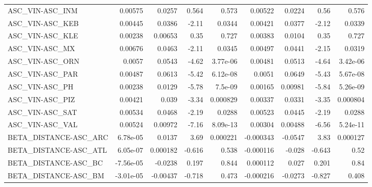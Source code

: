 \begin{tabular}{lrrrrrrrr}
ASC\_VIN-ASC\_INM                         &     0.00575 &       0.0257 &   0.564 &    0.573 &    0.00522 &      0.0224 &         0.56 &         0.576 \\
ASC\_VIN-ASC\_KEB                         &     0.00445 &       0.0386 &   -2.11 &   0.0344 &    0.00421 &      0.0377 &        -2.12 &        0.0339 \\
ASC\_VIN-ASC\_KLE                         &     0.00238 &      0.00653 &    0.35 &    0.727 &    0.00383 &      0.0104 &         0.35 &         0.727 \\
ASC\_VIN-ASC\_MX                          &     0.00676 &       0.0463 &   -2.11 &   0.0345 &    0.00497 &      0.0441 &        -2.15 &        0.0319 \\
ASC\_VIN-ASC\_ORN                         &      0.0057 &       0.0543 &   -4.62 & 3.77e-06 &    0.00481 &      0.0513 &        -4.64 &      3.42e-06 \\
ASC\_VIN-ASC\_PAR                         &     0.00487 &       0.0613 &   -5.42 & 6.12e-08 &     0.0051 &      0.0649 &        -5.43 &      5.67e-08 \\
ASC\_VIN-ASC\_PH                          &     0.00238 &       0.0129 &   -5.78 &  7.5e-09 &    0.00165 &     0.00981 &        -5.84 &      5.26e-09 \\
ASC\_VIN-ASC\_PIZ                         &     0.00421 &        0.039 &   -3.34 & 0.000829 &    0.00337 &      0.0331 &        -3.35 &      0.000804 \\
ASC\_VIN-ASC\_SAT                         &     0.00534 &       0.0468 &   -2.19 &   0.0288 &    0.00523 &      0.0445 &        -2.19 &        0.0288 \\
ASC\_VIN-ASC\_VAL                         &     0.00524 &      0.00972 &   -7.16 & 8.09e-13 &    0.00304 &     0.00488 &        -6.56 &      5.24e-11 \\
BETA\_DISTANCE-ASC\_ARC                   &    6.78e-05 &       0.0137 &    3.69 & 0.000221 &  -0.000343 &     -0.0547 &         3.83 &      0.000127 \\
BETA\_DISTANCE-ASC\_ATL                   &    6.05e-07 &     0.000182 &  -0.616 &    0.538 &  -0.000116 &      -0.028 &       -0.643 &          0.52 \\
BETA\_DISTANCE-ASC\_BC                    &   -7.56e-05 &      -0.0238 &   0.197 &    0.844 &   0.000112 &       0.027 &        0.201 &          0.84 \\
BETA\_DISTANCE-ASC\_BM                    &   -3.01e-05 &     -0.00437 &  -0.718 &    0.473 &  -0.000216 &     -0.0273 &       -0.827 &         0.408 \\

\end{tabular}
